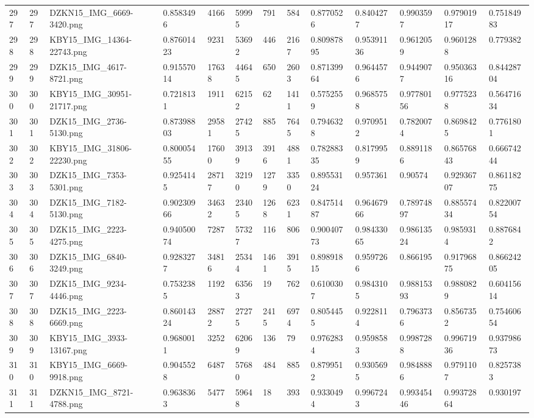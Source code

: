 \documentclass[11pt, a4paper, twoside]{report}
\begin{document}
\begin{longtable}[c]{@{}lllllllllllll@{}}
297 & 297 & DZKN15\_IMG\_6669-3420.png & 0.8583496 & 4166 & 59995 & 791 & 584 & 0.8770526 & 0.8404277 & 0.9903597 & 0.97901917 & 0.75184983 \\
298 & 298 & KBY15\_IMG\_14364-22743.png & 0.87601423 & 9231 & 53692 & 446 & 2167 & 0.80987895 & 0.95391136 & 0.9612059 & 0.9601288 & 0.779382 \\
299 & 299 & DZK15\_IMG\_4617-8721.png & 0.91557014 & 17638 & 44645 & 650 & 2603 & 0.87139964 & 0.9644576 & 0.9449077 & 0.95036316 & 0.84428704 \\
300 & 300 & KBY15\_IMG\_30951-21717.png & 0.7218131 & 1911 & 62152 & 62 & 1411 & 0.5752559 & 0.9685758 & 0.97780156 & 0.9775238 & 0.56471634 \\
301 & 301 & DZK15\_IMG\_2736-5130.png & 0.87398803 & 29581 & 27425 & 885 & 7645 & 0.7946328 & 0.9709512 & 0.7820074 & 0.8698425 & 0.7761801 \\
302 & 302 & KBY15\_IMG\_31806-22230.png & 0.80005455 & 17600 & 39139 & 3916 & 4881 & 0.78288335 & 0.8179959 & 0.8891186 & 0.86576843 & 0.66674244 \\
303 & 303 & DZK15\_IMG\_7353-5301.png & 0.9254145 & 28717 & 32190 & 1279 & 3350 & 0.89553124 & 0.957361 & 0.90574 & 0.92936707 & 0.86118275 \\
304 & 304 & DZK15\_IMG\_7182-5130.png & 0.90230966 & 34632 & 23405 & 1268 & 6231 & 0.84751487 & 0.96467966 & 0.78974897 & 0.88557434 & 0.82200754 \\
305 & 305 & DZK15\_IMG\_2223-4275.png & 0.94050074 & 7287 & 57327 & 116 & 806 & 0.90040773 & 0.98433065 & 0.98613524 & 0.9859314 & 0.8876842 \\
306 & 306 & DZK15\_IMG\_6840-3249.png & 0.9283277 & 34816 & 25344 & 1461 & 3915 & 0.89891815 & 0.9597266 & 0.866195 & 0.91796875 & 0.86624205 \\
307 & 307 & DZK15\_IMG\_9234-4446.png & 0.7532385 & 1192 & 63563 & 19 & 762 & 0.6100307 & 0.9843105 & 0.98815393 & 0.9880829 & 0.60415614 \\
308 & 308 & DZK15\_IMG\_2223-6669.png & 0.86014324 & 28872 & 27275 & 2415 & 6974 & 0.8054455 & 0.9228114 & 0.7963736 & 0.8567352 & 0.75460654 \\
309 & 309 & KBY15\_IMG\_3933-13167.png & 0.9680011 & 3252 & 62069 & 136 & 79 & 0.9762834 & 0.9598583 & 0.9987288 & 0.99671936 & 0.93798673 \\
310 & 310 & KBY15\_IMG\_6669-9918.png & 0.9045528 & 6487 & 57680 & 484 & 885 & 0.8799512 & 0.9305695 & 0.9848886 & 0.9791107 & 0.8257383 \\
311 & 311 & DZKN15\_IMG\_8721-4788.png & 0.9638363 & 5477 & 59648 & 18 & 393 & 0.9330494 & 0.9967243 & 0.99345446 & 0.99372864 & 0.930197 \\

\end{longtable}
\end{document}
